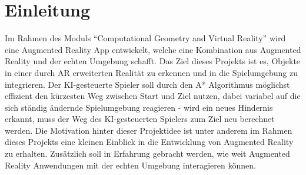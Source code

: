 \chapter{Einleitung}
Im Rahmen des Moduls “Computational Geometry and Virtual Reality” wird eine Augmented Reality App entwickelt, welche eine Kombination aus Augmented Reality und der echten Umgebung schafft. Das Ziel dieses Projekts ist es, Objekte in einer durch AR erweiterten Realit\"at zu erkennen und in die Spielumgebung zu integrieren. Der KI-gesteuerte Spieler soll durch den A* Algorithmus m\"oglichst effizient den k\"urzesten Weg zwischen Start und Ziel nutzen, dabei variabel auf die sich st\"andig \"andernde Spielumgebung reagieren - wird ein neues Hindernis erkannt, muss der Weg des KI-gesteuerten Spielers zum Ziel neu berechnet werden. 
Die Motivation hinter dieser Projektidee ist unter anderem im Rahmen dieses Projekts eine kleinen Einblick in die Entwicklung von Augmented Reality zu erhalten. Zusätzlich soll in Erfahrung gebracht werden, wie weit Augmented Reality Anwendungen mit der echten Umgebung interagieren können.